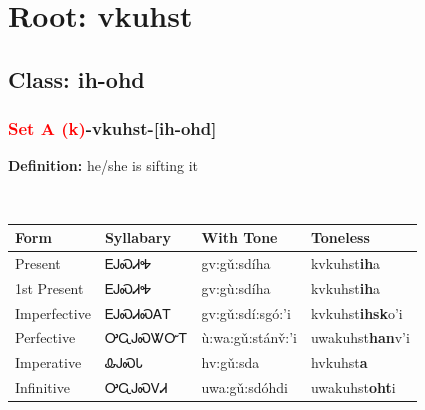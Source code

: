 \needspace{4in}
\section*{Root: vkuhst}
\nopagebreak
{}
\needspace{3in}
\subsection*{Class: ih-ohd}
\nopagebreak
\needspace{2in}
\subsubsection*{\textcolor{Red}{Set A (k)}{-}\textbf{vkuhst}{-}[ih-ohd]}
\nopagebreak
\textbf{Definition: } he/she is sifting it
\\[0.5em]
\begin{tabularx}{\textwidth}{l X X X}%
\toprule%
\textbf{Form}&\textbf{Syllabary}&\textbf{With Tone}&\textbf{Toneless}\\%
\midrule%
Present&ᎬᎫᏍᏗᎭ&gv:gǔ:sdíha&kvkuhst\textbf{ih}a\\%
1st Present&ᎬᎫᏍᏗᎭ&gv:gù:sdíha&kvkuhst\textbf{ih}a\\%
Imperfective&ᎬᎫᏍᏗᏍᎪᎢ&gv:gǔ:sdí:sgó:’i&kvkuhst\textbf{ihsk}o'i\\%
Perfective&ᎤᏩᎫᏍᏔᏅᎢ&ù:wa:gǔ:stánv̌:’i&uwakuhst\textbf{han}v'i\\%
Imperative&ᎲᎫᏍᏓ&hv:gǔ:sda&hvkuhst\textbf{a}\\%
Infinitive&ᎤᏩᎫᏍᏙᏗ&uwa:gǔ:sdóhdi&uwakuhst\textbf{oht}i\\%
\bottomrule%
\end{tabularx}
\\[1em]